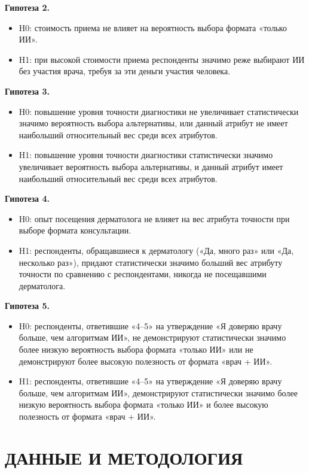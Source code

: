 \documentclass[12pt, a4paper]{article}
\begin{document}
\textbf{Гипотеза 2.}
\begin{itemize}
    \item H0: стоимость приема не влияет на вероятность выбора формата «только ИИ».
    \item H1: при высокой стоимости приема респонденты значимо реже выбирают ИИ без участия врача, требуя за эти деньги участия человека.
\end{itemize}

\textbf{Гипотеза 3.}
\begin{itemize}
    \item H0: повышение уровня точности диагностики не увеличивает статистически значимо вероятность выбора альтернативы, или данный атрибут не имеет наибольший относительный вес среди всех атрибутов.
    \item H1: повышение уровня точности диагностики статистически значимо увеличивает вероятность выбора альтернативы, и данный атрибут имеет наибольший относительный вес среди всех атрибутов.
\end{itemize}

\textbf{Гипотеза 4.}
\begin{itemize}
    \item H0: опыт посещения дерматолога не влияет на вес атрибута точности при выборе формата консультации.
    \item H1: респонденты, обращавшиеся к дерматологу («Да, много раз» или «Да, несколько раз»), придают статистически значимо больший вес атрибуту точности по сравнению с респондентами, никогда не посещавшими дерматолога.
\end{itemize}

\textbf{Гипотеза 5.}
\begin{itemize}
    \item H0: респонденты, ответившие «4--5» на утверждение «Я доверяю врачу больше, чем алгоритмам ИИ», не демонстрируют статистически значимо более низкую вероятность выбора формата «только ИИ» или не демонстрируют более высокую полезность от формата «врач + ИИ».
    \item H1: респонденты, ответившие «4--5» на утверждение «Я доверяю врачу больше, чем алгоритмам ИИ», демонстрируют статистически значимо более низкую вероятность выбора формата «только ИИ» и более высокую полезность от формата «врач + ИИ».
\end{itemize}

\newpage

\section{ДАННЫЕ И МЕТОДОЛОГИЯ}
\end{document}
